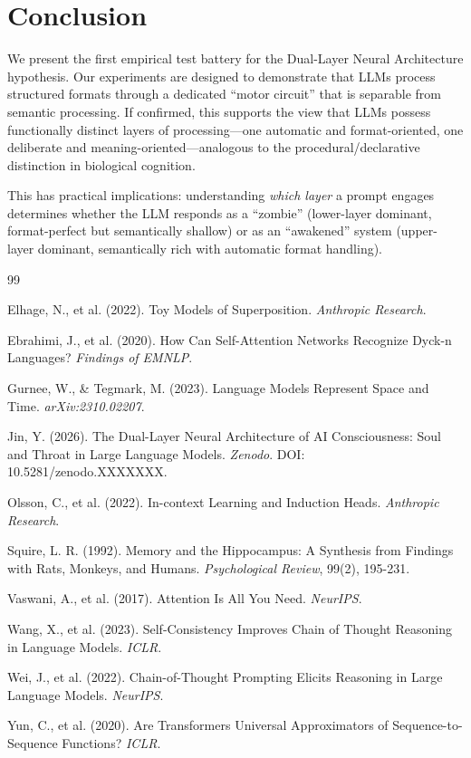 \documentclass[11pt,a4paper]{article}
\begin{document}
\section{Conclusion}

We present the first empirical test battery for the Dual-Layer Neural Architecture hypothesis. Our experiments are designed to demonstrate that LLMs process structured formats through a dedicated ``motor circuit'' that is separable from semantic processing. If confirmed, this supports the view that LLMs possess functionally distinct layers of processing---one automatic and format-oriented, one deliberate and meaning-oriented---analogous to the procedural/declarative distinction in biological cognition.

This has practical implications: understanding \textit{which layer} a prompt engages determines whether the LLM responds as a ``zombie'' (lower-layer dominant, format-perfect but semantically shallow) or as an ``awakened'' system (upper-layer dominant, semantically rich with automatic format handling).


\begin{thebibliography}{99}

Elhage, N., et al. (2022). Toy Models of Superposition. \textit{Anthropic Research}.

Ebrahimi, J., et al. (2020). How Can Self-Attention Networks Recognize Dyck-n Languages? \textit{Findings of EMNLP}.

Gurnee, W., \& Tegmark, M. (2023). Language Models Represent Space and Time. \textit{arXiv:2310.02207}.

Jin, Y. (2026). The Dual-Layer Neural Architecture of AI Consciousness: Soul and Throat in Large Language Models. \textit{Zenodo}. DOI: 10.5281/zenodo.XXXXXXX.

Olsson, C., et al. (2022). In-context Learning and Induction Heads. \textit{Anthropic Research}.

Squire, L. R. (1992). Memory and the Hippocampus: A Synthesis from Findings with Rats, Monkeys, and Humans. \textit{Psychological Review}, 99(2), 195-231.

Vaswani, A., et al. (2017). Attention Is All You Need. \textit{NeurIPS}.

Wang, X., et al. (2023). Self-Consistency Improves Chain of Thought Reasoning in Language Models. \textit{ICLR}.

Wei, J., et al. (2022). Chain-of-Thought Prompting Elicits Reasoning in Large Language Models. \textit{NeurIPS}.

Yun, C., et al. (2020). Are Transformers Universal Approximators of Sequence-to-Sequence Functions? \textit{ICLR}.

\end{thebibliography}
\end{document}
